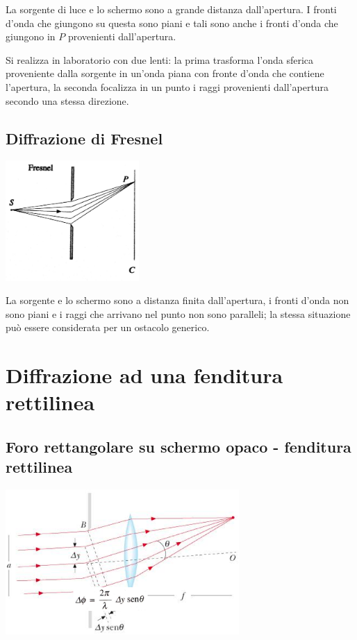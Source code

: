 La sorgente di luce e lo schermo sono a grande distanza dall'apertura. I fronti d'onda che giungono su questa sono piani e tali sono anche i fronti d'onda che giungono in $P$ provenienti dall'apertura.

Si realizza in laboratorio con due lenti: la prima trasforma l'onda sferica proveniente dalla sorgente in un'onda piana con fronte d'onda che contiene l'apertura, la seconda focalizza in un punto i raggi provenienti dall'apertura secondo una stessa direzione.

\subsection{Diffrazione di Fresnel}
\begin{center}
\includegraphics[width=2in]{immagini/fresnel.jpg}
\end{center}

La sorgente e lo schermo sono a distanza finita dall'apertura, i fronti d'onda non sono piani e i raggi che arrivano nel punto non sono paralleli; la stessa situazione può essere considerata per un ostacolo generico.

\section{Diffrazione ad una fenditura rettilinea}%
\subsection{Foro rettangolare su schermo opaco - fenditura rettilinea}
\begin{center}
\includegraphics[width=3.5in]{immagini/huygens-fresnel.png}
\end{center}

